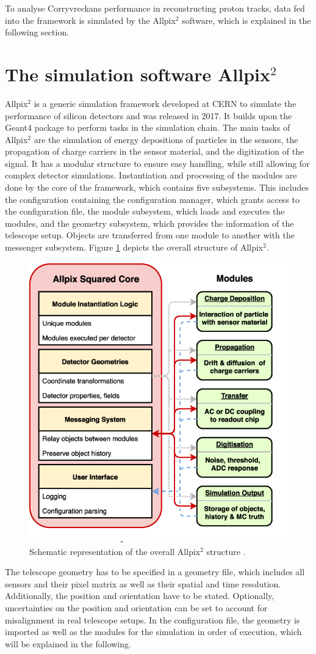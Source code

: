 To analyse Corryvreckans performance in reconstructing proton tracks, data fed into the framework is simulated by the Allpix$^2$ software,
which is explained in the following section.

\section{The simulation software Allpix$^2$}
Allpix$^2$ is a generic simulation framework developed at CERN to simulate the performance of silicon detectors and was released in 2017.
It builds upon the
Geant4 \cite{geant4} package to perform tasks in the simulation chain. The main tasks of Allpix$^2$ are the simulation of energy depositions of particles
in the sensors, the propagation of charge carriers in the sensor material, and the digitization of the signal. It has a modular
structure to ensure easy handling, while still allowing for complex detector simulations.
Instantiation and processing of the modules are done by the core of the framework,
which contains five subsystems. This includes the configuration containing the configuration manager, which grants access to the configuration file, the
module subsystem, which loads and executes the modules, and the geometry subsystem, which provides the information of the telescope setup.
Objects are transferred from one module to another with the messenger subsystem.
Figure \ref{fig:allpix} depicts the overall structure of Allpix$^2$.

\begin{figure}
  \centering
  \includegraphics[height=0.5\textwidth]{images/allpix.png}
  \caption{Schematic representation of the overall Allpix$^2$ structure \cite{fig_allpix}.}
  \label{fig:allpix}
\end{figure}

The telescope geometry has to be specified in a geometry file, which includes all sensors and their pixel matrix as well as their spatial and time
resolution. Additionally,
the position and orientation have to be stated. Optionally, uncertainties on the position and orientation can be set to account for misalignment in real
telescope setups.
In the configuration file, the geometry is imported as well as the modules for the simulation in order of execution, which
will be explained in the following.

